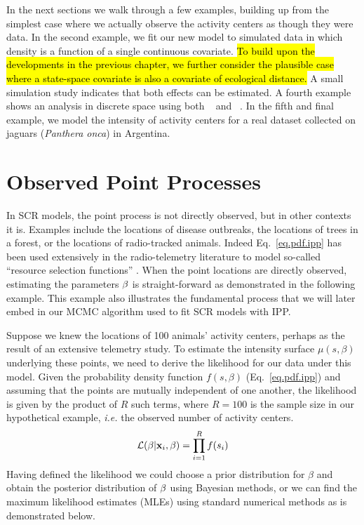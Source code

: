In the next sections we walk through a few examples, building up from
the simplest case where we actually observe the activity centers as
though they were data. In the second example, we fit our new model to simulated
data in which density is a function of a single continuous
covariate. \hl{To build upon the developments in the previous chapter, we
further consider the plausible case where a state-space covariate is also a
covariate of ecological distance.} A small simulation study indicates
that both effects can be estimated. A fourth example shows an analysis in discrete space using
both \secr~\citep{efford:2011} and \jags~\citep{plummer:2003}. In the
fifth and final example, we model the intensity of
activity centers for a real dataset collected on jaguars
(\emph{Panthera onca}) in Argentina.

\section{Observed Point Processes}

In SCR models, the point process is not directly observed, but in
other contexts it is. Examples include the locations of disease
outbreaks, the locations of trees in a forest, or the locations of
radio-tracked animals. Indeed Eq.~\ref{eq.pdf.ipp} has been used
extensively in the radio-telemetry literature to model so-called
``resource selection functions'' \citep{manly_etal:2002,lele_keim:2006}.
When the point locations are directly observed,
estimating the parameters $\bf \beta$ is straight-forward as
demonstrated in the following example. This example also illustrates
the fundamental process that we will later embed in our MCMC algorithm
used to fit SCR models with IPP.

Suppose we knew the locations of 100 animals' activity
centers, perhaps as the result of an extensive telemetry study. To
estimate the intensity surface $\mu(s, \beta)$ underlying these
points, we need to derive the likelihood for our data under this
model. Given the probability density function $f(s, \beta)$
(Eq.~\ref{eq.pdf.ipp}) and assuming that the points are
mutually independent of one another,
the likelihood is given by the product
of $R$ such terms, where $R=100$ is the sample size in our
hypothetical example,
\emph{i.e.} the observed number of activity centers.
\[
\mathcal{L}({\bf \beta} | {\bf x}_i, \beta) = \prod_{i=1}^R f(s_i)
\]
Having defined the likelihood we could choose a prior distribution for
$\beta$ and obtain the posterior distribution of
$\bf \beta$ using Bayesian methods, or we can find the maximum likelihood
estimates (MLEs) using standard numerical methods as is demonstrated
below.

